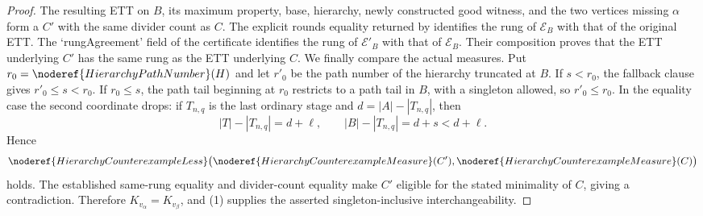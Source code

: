 \begin{proof}
The resulting ETT on $B$, its maximum property, base, hierarchy,
newly constructed good witness, and the two vertices missing $\alpha$
form a  $C'$ with the same divider
count as $C$.  The explicit rounds equality returned by
 identifies the rung of
$\mathcal E_B$ with that of the original ETT.  The `rungAgreement' field
of the  certificate identifies
the rung of $\mathcal E'_B$ with that of $\mathcal E_B$.  Their composition
proves that the ETT underlying $C'$ has the same rung as the ETT
underlying $C$.  We finally compare the actual measures.  Put
$r_0=\noderef{HierarchyPathNumber}(H)$ and let $r'_0$ be the path
number of the hierarchy truncated at $B$.  If $s<r_0$, the fallback
clause gives $r'_0\leq s<r_0$.  If $r_0\leq s$, the path tail beginning
at $r_0$ restricts to a path tail in $B$, with a singleton allowed, so
$r'_0\leq r_0$.  In the equality case the second coordinate drops:
if $T_{n,q}$ is the last ordinary stage and
$d=|A|-|T_{n,q}|$, then
\[
 |T|-|T_{n,q}|=d+\ell,\qquad |B|-|T_{n,q}|=d+s<d+\ell.
\]
Hence
\[
 \noderef{HierarchyCounterexampleLess}
   \bigl(\noderef{HierarchyCounterexampleMeasure}(C'),
         \noderef{HierarchyCounterexampleMeasure}(C)\bigr)
\]
holds.  The established same-rung equality and divider-count equality
make $C'$ eligible for the stated minimality of $C$, giving a
contradiction.  Therefore
$K_{v_\alpha}=K_{v_\beta}$, and (1) supplies the asserted
singleton-inclusive interchangeability.
\end{proof}
